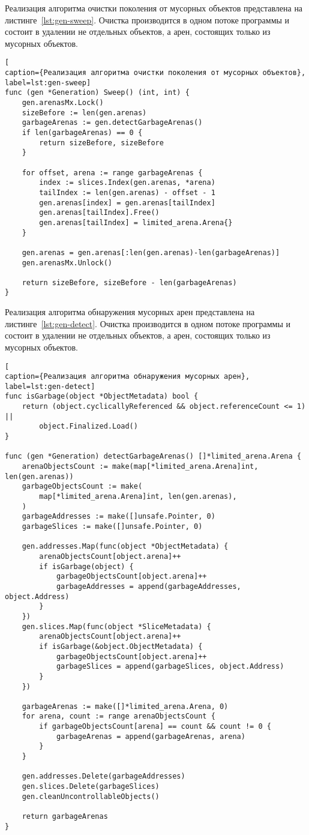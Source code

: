 Реализация алгоритма очистки поколения от мусорных объектов представлена на листинге~\ref{lst:gen-sweep}. Очистка производится в одном потоке программы и состоит в удалении не отдельных объектов, а арен, состоящих только из мусорных объектов.

\begin{lstlisting}[
caption={Реализация алгоритма очистки поколения от мусорных объектов},
label=lst:gen-sweep]
func (gen *Generation) Sweep() (int, int) {
	gen.arenasMx.Lock()
	sizeBefore := len(gen.arenas)
	garbageArenas := gen.detectGarbageArenas()
	if len(garbageArenas) == 0 {
		return sizeBefore, sizeBefore
	}
	
	for offset, arena := range garbageArenas {
		index := slices.Index(gen.arenas, *arena)
		tailIndex := len(gen.arenas) - offset - 1
		gen.arenas[index] = gen.arenas[tailIndex]
		gen.arenas[tailIndex].Free()
		gen.arenas[tailIndex] = limited_arena.Arena{}
	}
	
	gen.arenas = gen.arenas[:len(gen.arenas)-len(garbageArenas)]
	gen.arenasMx.Unlock()
	
	return sizeBefore, sizeBefore - len(garbageArenas)
}
\end{lstlisting}

Реализация алгоритма обнаружения мусорных арен представлена на листинге~\ref{lst:gen-detect}. Очистка производится в одном потоке программы и состоит в удалении не отдельных объектов, а арен, состоящих только из мусорных объектов.

\begin{lstlisting}[
caption={Реализация алгоритма обнаружения мусорных арен},
label=lst:gen-detect]
func isGarbage(object *ObjectMetadata) bool {
	return (object.cyclicallyReferenced && object.referenceCount <= 1) || 
		object.Finalized.Load()
}

func (gen *Generation) detectGarbageArenas() []*limited_arena.Arena {
	arenaObjectsCount := make(map[*limited_arena.Arena]int, len(gen.arenas))
	garbageObjectsCount := make(
		map[*limited_arena.Arena]int, len(gen.arenas),
	)
	garbageAddresses := make([]unsafe.Pointer, 0)
	garbageSlices := make([]unsafe.Pointer, 0)
	
	gen.addresses.Map(func(object *ObjectMetadata) {
		arenaObjectsCount[object.arena]++
		if isGarbage(object) {
			garbageObjectsCount[object.arena]++
			garbageAddresses = append(garbageAddresses, object.Address)
		}
	})
	gen.slices.Map(func(object *SliceMetadata) {
		arenaObjectsCount[object.arena]++
		if isGarbage(&object.ObjectMetadata) {
			garbageObjectsCount[object.arena]++
			garbageSlices = append(garbageSlices, object.Address)
		}
	})
	
	garbageArenas := make([]*limited_arena.Arena, 0)
	for arena, count := range arenaObjectsCount {
		if garbageObjectsCount[arena] == count && count != 0 {
			garbageArenas = append(garbageArenas, arena)
		}
	}
	
	gen.addresses.Delete(garbageAddresses)
	gen.slices.Delete(garbageSlices)
	gen.cleanUncontrollableObjects()
	
	return garbageArenas
}
\end{lstlisting}



